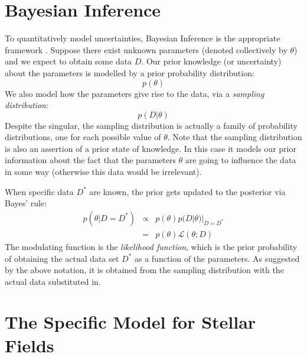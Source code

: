 \documentclass[letterpaper, 11pt]{article}
\begin{document}
\section{Bayesian Inference}
To quantitatively model uncertainties, Bayesian Inference is the appropriate
framework \citep{cox, jaynes, caticha}. Suppose there exist unknown parameters (denoted
collectively by $\theta$) and we expect to obtain some data $D$. Our prior
knowledge (or uncertainty) about the parameters is modelled by a prior
probability distribution:
\begin{equation}
p(\theta)
\end{equation}
We also model how the parameters give rise to the data, via a {\it sampling
distribution}:
\begin{equation}
p(D|\theta)
\end{equation}
Despite the singular, the sampling distribution is actually a family of
probability distributions, one for each possible value of $\theta$. Note that
the sampling distribution is also an assertion of a prior state of knowledge.
In this case it models our prior information about the fact that the parameters
$\theta$ are going to influence the data in some way (otherwise this data
would be irrelevant).

When specific data $D^*$ are known, the prior gets updated to the posterior
via Bayes' rule:
\begin{eqnarray}
p(\theta|D=D^*) &\propto& p(\theta)p(D|\theta)|_{D=D^*} \\
&=& p(\theta)\mathcal{L}(\theta; D)
\end{eqnarray}
The modulating function is the {\it likelihood function}, which is the prior
probability of obtaining the actual data set $D^*$ as a function of the
parameters. As suggested by the above notation, it is obtained from the
sampling distribution with the actual data substituted in.

\section{The Specific Model for Stellar Fields}
\end{document}
